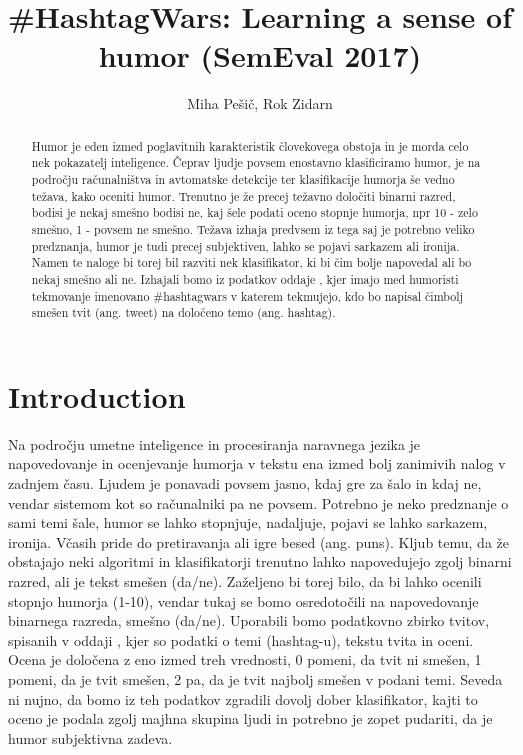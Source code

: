 \documentclass[a4paper]{article}
\title{\#HashtagWars: Learning a sense of humor (SemEval 2017)}
\author{Miha Pešič, Rok Zidarn}
\begin{document}
\maketitle

\begin{abstract}
Humor je eden izmed poglavitnih karakteristik človekovega obstoja in je morda celo nek pokazatelj inteligence. Čeprav ljudje povsem enostavno klasificiramo humor, je na področju računalništva in avtomatske detekcije ter klasifikacije humorja še vedno težava, kako oceniti humor. Trenutno je že precej težavno določiti binarni razred, bodisi je nekaj smešno bodisi ne, kaj šele podati oceno stopnje humorja, npr 10 - zelo smešno, 1 - povsem ne smešno. Težava izhaja predvsem iz tega saj je potrebno veliko predznanja, humor je tudi precej subjektiven, lahko se pojavi sarkazem ali ironija. Namen te naloge bi torej bil razviti nek klasifikator, ki bi čim bolje napovedal ali bo nekaj smešno ali ne. Izhajali bomo iz podatkov oddaje \@midnight, kjer imajo med humoristi tekmovanje imenovano \#hashtagwars v katerem tekmujejo, kdo bo napisal čimbolj smešen tvit (ang. tweet) na določeno temo (ang. hashtag).
\end{abstract}

\section{Introduction}

Na področju umetne inteligence in procesiranja naravnega jezika je napovedovanje in ocenjevanje humorja v tekstu ena izmed bolj zanimivih nalog v zadnjem času. Ljudem je ponavadi povsem jasno, kdaj gre za šalo in kdaj ne, vendar sistemom kot so računalniki pa ne povsem. Potrebno je neko predznanje o sami temi šale, humor se lahko stopnjuje, nadaljuje, pojavi se lahko sarkazem, ironija. Včasih pride do pretiravanja ali igre besed (ang. puns). Kljub temu, da že obstajajo neki algoritmi in klasifikatorji trenutno lahko napovedujejo zgolj binarni razred, ali je tekst smešen (da/ne). Zaželjeno bi torej bilo, da bi lahko ocenili stopnjo humorja (1-10), vendar tukaj se bomo osredotočili na napovedovanje binarnega razreda, smešno (da/ne). Uporabili bomo podatkovno zbirko tvitov, spisanih v oddaji \@midnight, kjer so podatki o temi (hashtag-u), tekstu tvita in oceni. Ocena je določena z eno izmed treh vrednosti, 0 pomeni, da tvit ni smešen, 1 pomeni, da je tvit smešen, 2 pa, da je tvit najbolj smešen v podani temi. Seveda ni nujno, da bomo iz teh podatkov zgradili dovolj dober klasifikator, kajti to oceno je podala zgolj majhna skupina ljudi in potrebno je zopet pudariti, da je humor subjektivna zadeva.
\end{document}
